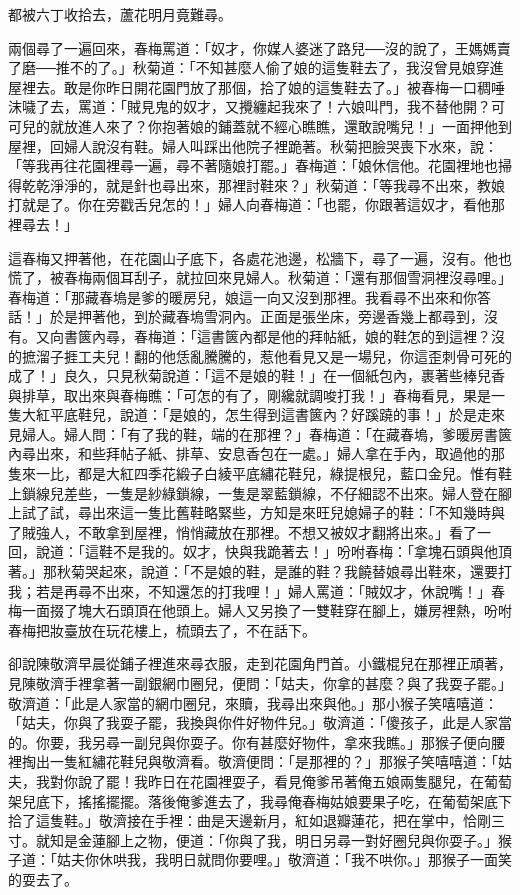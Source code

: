 都被六丁收拾去，蘆花明月竟難尋。

兩個尋了一遍回來，春梅罵道：「奴才，你媒人婆迷了路兒──沒的說了，王媽媽賣了磨──推不的了。」秋菊道：「不知甚麼人偷了娘的這隻鞋去了，我沒曾見娘穿進屋裡去。敢是你昨日開花園門放了那個，拾了娘的這隻鞋去了。」被春梅一口稠唾沫噦了去，罵道：「賊見鬼的奴才，又攪纏起我來了！六娘叫門，我不替他開？可可兒的就放進人來了？你抱著娘的鋪蓋就不經心瞧瞧，還敢說嘴兒！」一面押他到屋裡，回婦人說沒有鞋。婦人叫踩出他院子裡跪著。秋菊把臉哭喪下水來，說：「等我再往花園裡尋一遍，尋不著隨娘打罷。」春梅道：「娘休信他。花園裡地也掃得乾乾淨淨的，就是針也尋出來，那裡討鞋來？」秋菊道：「等我尋不出來，教娘打就是了。你在旁戳舌兒怎的！」婦人向春梅道：「也罷，你跟著這奴才，看他那裡尋去！」

這春梅又押著他，在花園山子底下，各處花池邊，松牆下，尋了一遍，沒有。他也慌了，被春梅兩個耳刮子，就拉回來見婦人。秋菊道：「還有那個雪洞裡沒尋哩。」春梅道：「那藏春塢是爹的暖房兒，娘這一向又沒到那裡。我看尋不出來和你答話！」於是押著他，到於藏春塢雪洞內。正面是張坐床，旁邊香幾上都尋到，沒有。又向書篋內尋，春梅道：「這書篋內都是他的拜帖紙，娘的鞋怎的到這裡？沒的摭溜子捱工夫兒！翻的他恁亂騰騰的，惹他看見又是一場兒，你這歪刺骨可死的成了！」良久，只見秋菊說道：「這不是娘的鞋！」在一個紙包內，裹著些棒兒香與排草，取出來與春梅瞧：「可怎的有了，剛纔就調唆打我！」春梅看見，果是一隻大紅平底鞋兒，說道：「是娘的，怎生得到這書篋內？好蹊蹺的事！」於是走來見婦人。婦人問：「有了我的鞋，端的在那裡？」春梅道：「在藏春塢，爹暖房書篋內尋出來，和些拜帖子紙、排草、安息香包在一處。」婦人拿在手內，取過他的那隻來一比，都是大紅四季花緞子白綾平底繡花鞋兒，綠提根兒，藍口金兒。惟有鞋上鎖線兒差些，一隻是紗綠鎖線，一隻是翠藍鎖線，不仔細認不出來。婦人登在腳上試了試，尋出來這一隻比舊鞋略緊些，方知是來旺兒媳婦子的鞋：「不知幾時與了賊強人，不敢拿到屋裡，悄悄藏放在那裡。不想又被奴才翻將出來。」看了一回，說道：「這鞋不是我的。奴才，快與我跪著去！」吩咐春梅：「拿塊石頭與他頂著。」那秋菊哭起來，說道：「不是娘的鞋，是誰的鞋？我饒替娘尋出鞋來，還要打我；若是再尋不出來，不知還怎的打我哩！」婦人罵道：「賊奴才，休說嘴！」春梅一面掇了塊大石頭頂在他頭上。婦人又另換了一雙鞋穿在腳上，嫌房裡熱，吩咐春梅把妝臺放在玩花樓上，梳頭去了，不在話下。

卻說陳敬濟早晨從鋪子裡進來尋衣服，走到花園角門首。小鐵棍兒在那裡正頑著，見陳敬濟手裡拿著一副銀網巾圈兒，便問：「姑夫，你拿的甚麼？與了我耍子罷。」敬濟道：「此是人家當的網巾圈兒，來贖，我尋出來與他。」那小猴子笑嘻嘻道：「姑夫，你與了我耍子罷，我換與你件好物件兒。」敬濟道：「傻孩子，此是人家當的。你要，我另尋一副兒與你耍子。你有甚麼好物件，拿來我瞧。」那猴子便向腰裡掏出一隻紅繡花鞋兒與敬濟看。敬濟便問：「是那裡的？」那猴子笑嘻嘻道：「姑夫，我對你說了罷！我昨日在花園裡耍子，看見俺爹吊著俺五娘兩隻腿兒，在葡萄架兒底下，搖搖擺擺。落後俺爹進去了，我尋俺春梅姑娘要果子吃，在葡萄架底下拾了這隻鞋。」敬濟接在手裡：曲是天邊新月，紅如退瓣蓮花，把在掌中，恰剛三寸。就知是金蓮腳上之物，便道：「你與了我，明日另尋一對好圈兒與你耍子。」猴子道：「姑夫你休哄我，我明日就問你要哩。」敬濟道：「我不哄你。」那猴子一面笑的耍去了。

